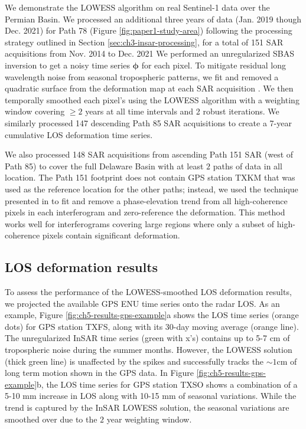 We demonstrate the LOWESS algorithm on real Sentinel-1 data over the Permian Basin.
We processed an additional three years of data (Jan. 2019 though Dec. 2021) for Path 78 (Figure \ref{fig:paper1-study-area}) following the processing strategy outlined in Section \ref{sec:ch3-insar-processing}, for a total of 151 SAR acquisitions from Nov. 2014 to Dec. 2021
We performed an unregularized SBAS inversion to get a noisy time series $ \bm{\phi} $ for each pixel. 
To mitigate residual long wavelength noise from seasonal tropospheric patterns, we fit and removed a quadratic surface from the deformation map at each SAR acquisition \citep{Morishita2020LicsbasOpenSource}. We then temporally smoothed each pixel's using the LOWESS algorithm with a weighting window covering $\geq 2$ years at all time intervals and 2 robust iterations. We similarly processed 147 descending Path 85 SAR acquisitions to create a 7-year cumulative LOS deformation time series.

We also processed 148 SAR acquisitions from ascending Path 151 SAR (west of Path 85) to cover the full Delaware Basin with at least $2$ paths of data in all location.
The Path 151 footprint does not contain GPS station TXKM that was used as the reference location for the other paths;
instead, we used the technique presented in \cite{Zebker2021AccuracyModelFree} to fit and remove a phase-elevation trend from all high-coherence pixels in each interferogram and zero-reference the deformation. This method works well for interferograms covering large regions where only a subset of high-coherence pixels contain significant deformation.


\subsection{LOS deformation results}
\label{sec:ch5-results-path78}


To assess the performance of the LOWESS-smoothed LOS deformation results, we projected the available GPS ENU time series onto the radar LOS. 
As an example, Figure \ref{fig:ch5-results-gps-example}a shows the LOS time series (orange dots) for GPS station TXFS, along with its 30-day moving average (orange line).
The unregularized InSAR time series (green with x's) contains up to 5-7 cm of tropospheric noise during the summer months. However, the LOWESS solution (thick green line) is unaffected by the spikes and successfully tracks the $ \sim1 $cm of long term motion shown in the GPS data. 
In Figure \ref{fig:ch5-results-gps-example}b, the LOS time series for GPS station TXSO shows a combination of a 5-10 mm increase in LOS along with 10-15 mm of seasonal variations.
While the trend is captured by the InSAR LOWESS solution, the seasonal variations are smoothed over due to the $2$ year weighting window.




